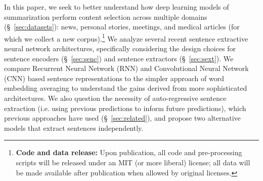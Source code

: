 In this paper, we seek to better understand how deep learning models of 
summarization perform content selection across multiple domains (\S~\ref{sec:datasets}): news, personal stories,
meetings, and medical articles (for which we collect a new corpus).\footnote{\textbf{Code and data release:} Upon
publication, all code and pre-processing scripts
will be released under an MIT (or more liberal)
license; all data will be made available after
publication when allowed by original licenses.}
We analyze
several recent sentence extractive neural network architectures, 
specifically considering the design choices for sentence encoders (\S~\ref{sec:senc})
and sentence extractors (\S~\ref{sec:sext}). We compare Recurrent Neural Network (RNN) and Convolutional Neural
Network (CNN) based sentence representations to the 
simpler approach of word embedding averaging to understand the gains 
derived from more sophisticated architectures.
We also question the necessity of auto-regressive sentence extraction 
(i.e. using previous predictions to inform future predictions), 
which previous approaches have used (\S~\ref{sec:related}),
and propose two alternative models that extract sentences independently.
%
%
%
%
\\[-0.5em]

